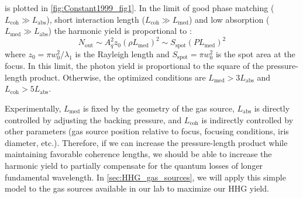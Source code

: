  is plotted in \cref{fig:Constant1999_fig1}. In the limit of good phase matching ($L_{\textrm{coh}} \gg L_{\textrm{abs}}$), short interaction length ($L_{\textrm{coh}} \gg L_{\textrm{med}}$) and low absorption ($L_{\textrm{med}} \gg L_{\textrm{abs}}$) the harmonic yield is proportional to \cite{takahashiGenerationStrongOptical2004}:
\begin{equation}
N_{\textrm{out}} \sim A_q^2 z_0 (\rho L_{\textrm{med}})^2 \sim S_{\textrm{spot}} (P L_{\textrm{med}})^2
\label{eqn:HHG_Nout_2}
\end{equation}
where $z_0 = \pi w_0^2 / \lambda_1$ is the Rayleigh length and $S_{\textrm{spot}} = \pi w_0^2$ is the spot area at the focus. In this limit, the photon yield is proportional to the square of the pressure-length product. Otherwise, the optimized conditions are $L_{\textrm{med}} > 3 L_{\textrm{abs}}$ and $L_{\textrm{coh}} > 5 L_{\textrm{abs}}$.


Experimentally, $L_{\textrm{med}}$ is fixed by the geometry of the gas source, $L_{\textrm{abs}}$ is directly controlled by adjusting the backing pressure, and $L_{\textrm{coh}}$ is indirectly controlled by other parameters (gas source position relative to focus, focusing conditions, iris diameter, etc.). Therefore, if we can increase the pressure-length product while maintaining favorable coherence lengths, we should be able to increase the harmonic yield to partially compensate for the quantum losses of longer fundamental wavelength. In \cref{sec:HHG_gas_sources}, we will apply this simple model to the gas sources available in our lab to maximize our HHG yield.

%
%


